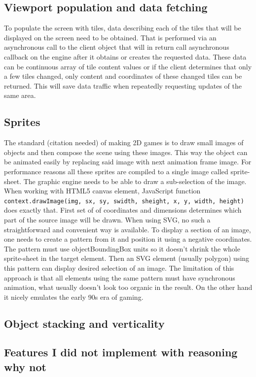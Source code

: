 \documentclass[11pt,oneside, final]{fithesis2}
\begin{document}
\subsection{Viewport population and data fetching}
To populate the screen with tiles, data describing each of the tiles that will be displayed on the screen need to be obtained. That is performed via an asynchronous call to the client object that will in return call asynchronous callback on the engine after it obtains or creates the requested data. These data can be continuous array of tile content values or if the client determines that only a few tiles changed, only content and coordinates of these changed tiles can be returned. This will save data traffic when repeatedly requesting updates of the same area.

\subsection{Sprites}
The standard (citation needed) of making 2D games is to draw small images of objects and then compose the scene using these images. This way the object can be animated easily by replacing said image with next animation frame image. For performance reasons all these sprites are compiled to a single image called sprite-sheet. The graphic engine needs to be able to draw a sub-selection of the image. When working with HTML5 canvas element, JavaScript function \texttt{context.drawImage(img, sx, sy, swidth, sheight, x, y, width, height)} does exactly that. First set of of coordinates and dimensions determines which part of the source image will be drawn. When using SVG, no such a straightforward and convenient way is available. To display a section of an image, one needs to create a pattern from it and position it using a negative coordinates. The pattern must use objectBoundingBox units so it doesn't shrink the whole sprite-sheet in the target element. Then an SVG element (usually polygon) using this pattern can display desired selection of an image.
The limitation of this approach is that all elements using the same pattern must have synchronous animation, what usually doesn't look too organic in the result. On the other hand it nicely emulates the early 90s era of gaming.

\subsection{Object stacking and verticality}

\subsection{Features I did not implement with reasoning why not}
\end{document}
